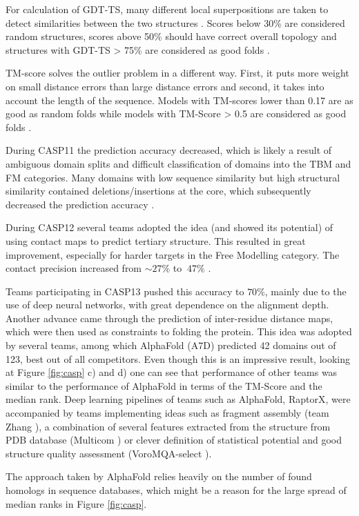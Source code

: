 For calculation of GDT-TS, many different local superpositions are taken to detect similarities between the two structures \cite{gdt1}. 
Scores below 30\% are considered random structures, scores above 50\% should have correct overall topology and structures with GDT-TS > 75\% are considered as good folds \cite{casp13}.

TM-score solves the outlier problem in a different way. 
First, it puts more weight on small distance errors than large distance errors and second, it takes into account the length of the sequence. 
Models with TM-scores lower than 0.17 are as good as random folds while models with TM-Score > 0.5 are considered as good folds \cite{tmscore}.

During CASP11 the prediction accuracy decreased, which is likely a result of ambiguous domain splits and difficult classification of domains into the TBM and FM categories. 
Many domains with low sequence similarity but high structural similarity contained deletions/insertions at the core, which subsequently decreased the prediction accuracy \cite{casp11}.

During CASP12 several teams adopted the idea (and showed its potential) of using contact maps to predict tertiary structure. 
This resulted in great improvement, especially for harder targets in the Free Modelling category. 
The contact precision increased from $\sim 27\%$ to $~47\%$ \cite{casp12}.

Teams participating in CASP13 pushed this accuracy to $70\%$, mainly due to the use of deep neural networks, with great dependence on the alignment depth. 
Another advance came through the prediction of inter-residue distance maps, which were then used as constraints to folding the protein. 
This idea was adopted by several teams, among which AlphaFold (A7D) predicted 42 domains out of 123, best out of all competitors. 
Even though this is an impressive result, looking at Figure \ref{fig:casp} c) and d) one can see that performance of other teams was similar to the performance of AlphaFold in terms of the TM-Score and the median rank. 
Deep learning pipelines of teams such as AlphaFold, RaptorX, were accompanied by teams implementing ideas such as fragment assembly (team Zhang \cite{zhang}), a combination of several features extracted from the structure from PDB database (Multicom \cite{multicom0}) or clever definition of statistical potential and good structure quality assessment (VoroMQA-select \cite{voromqa}).

The approach taken by AlphaFold relies heavily on the number of found homologs in sequence databases, which might be a reason for the large spread of median ranks in Figure \ref{fig:casp}.
